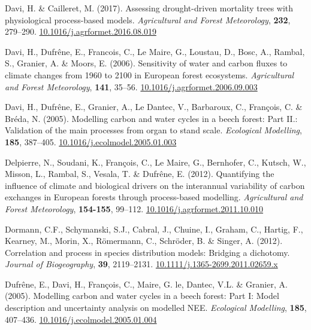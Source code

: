 \documentclass[11pt,]{article}
\newlength{\cslhangindent}
\newenvironment{CSLReferences}[2] %
 {%
  \setlength{\parindent}{0pt}
  \ifodd #1 \everypar{\setlength{\hangindent}{\cslhangindent}}\ignorespaces\fi
  \ifnum #2 > 0
  \setlength{\parskip}{#2\baselineskip}
  \fi
 }%
 {}
\begin{document}
\begin{CSLReferences}{1}{0}
\leavevmode{}%
Davi, H. \& Cailleret, M. (2017). Assessing drought-driven mortality
trees with physiological process-based models. \emph{Agricultural and
Forest Meteorology}, \textbf{232}, 279--290.
\href{https://doi.org/10.1016/j.agrformet.2016.08.019}{10.1016/j.agrformet.2016.08.019}

\leavevmode{}%
Davi, H., Dufrêne, E., Francois, C., Le Maire, G., Loustau, D., Bosc,
A., Rambal, S., Granier, A. \& Moors, E. (2006). Sensitivity of water
and carbon fluxes to climate changes from 1960 to 2100 in {European}
forest ecosystems. \emph{Agricultural and Forest Meteorology},
\textbf{141}, 35--56.
\href{https://doi.org/10.1016/j.agrformet.2006.09.003}{10.1016/j.agrformet.2006.09.003}

\leavevmode{}%
Davi, H., Dufrêne, E., Granier, A., Le Dantec, V., Barbaroux, C.,
François, C. \& Bréda, N. (2005). Modelling carbon and water cycles in a
beech forest: {Part} {II}.: {Validation} of the main processes from
organ to stand scale. \emph{Ecological Modelling}, \textbf{185},
387--405.
\href{https://doi.org/10.1016/j.ecolmodel.2005.01.003}{10.1016/j.ecolmodel.2005.01.003}

\leavevmode{}%
Delpierre, N., Soudani, K., François, C., Le Maire, G., Bernhofer, C.,
Kutsch, W., Misson, L., Rambal, S., Vesala, T. \& Dufrêne, E. (2012).
Quantifying the influence of climate and biological drivers on the
interannual variability of carbon exchanges in {European} forests
through process-based modelling. \emph{Agricultural and Forest
Meteorology}, \textbf{154-155}, 99--112.
\href{https://doi.org/10.1016/j.agrformet.2011.10.010}{10.1016/j.agrformet.2011.10.010}

\leavevmode{}%
Dormann, C.F., Schymanski, S.J., Cabral, J., Chuine, I., Graham, C.,
Hartig, F., Kearney, M., Morin, X., Römermann, C., Schröder, B. \&
Singer, A. (2012). Correlation and process in species distribution
models: Bridging a dichotomy. \emph{Journal of Biogeography},
\textbf{39}, 2119--2131.
\href{https://doi.org/10.1111/j.1365-2699.2011.02659.x}{10.1111/j.1365-2699.2011.02659.x}

\leavevmode{}%
Dufrêne, E., Davi, H., François, C., Maire, G. le, Dantec, V.L. \&
Granier, A. (2005). Modelling carbon and water cycles in a beech forest:
{Part} {I}: {Model} description and uncertainty analysis on modelled
{NEE}. \emph{Ecological Modelling}, \textbf{185}, 407--436.
\href{https://doi.org/10.1016/j.ecolmodel.2005.01.004}{10.1016/j.ecolmodel.2005.01.004}


\end{CSLReferences}
\end{document}
